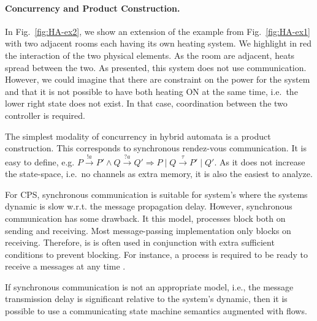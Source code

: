 \documentclass[
graybox,
envcountchap
]{svmult}
\begin{document}
\begin{bibunit}
\paragraph{Concurrency and Product Construction.}
In Fig.~\ref{fig:HA-ex2}, we show an extension of the example from Fig.~\ref{fig:HA-ex1} with two adjacent rooms each having its own heating system.
We highlight in {\color{red!90!black}red} the interaction of the two physical elements.
As the room are adjacent, heats spread between the two.
As presented, this system does not use communication.
However, we could imagine that there are constraint on the power for the system and that it is not possible to have both heating ON at the same time, i.e.~the lower right state does not exist.
In that case, coordination between the two controller is required.


The simplest modality of concurrency in hybrid automata is a product construction.
This corresponds to synchronous rendez-vous communication.
It is easy to define, e.g. $P \stackrel{!a}{\rightarrow} P' \land Q \stackrel{?a}{\rightarrow} Q' \Rightarrow P \mid Q \stackrel{\tau}{\rightarrow} P' \mid Q'$.
As it does not increase the state-space, i.e.~no channels as extra memory, it is also the easiest to analyze.

For CPS, synchronous communication is suitable for system's where the systems dynamic is slow w.r.t. the message propagation delay.
However, synchronous communication has some drawback.
It this model, processes block both on sending and receiving.
Most message-passing implementation only blocks on receiving.
Therefore, is is often used in conjunction with extra sufficient conditions to prevent blocking.
For instance, a process is required to be ready to receive a messages at any time \cite{?}. 

If synchronous communication is not an appropriate model, i.e., the message transmission delay is significant relative to the system's dynamic, then it is possible to use a communicating state machine semantics \cite{DBLP:journals/jacm/BrandZ83} augmented with flows.


\end{bibunit}
\end{document}
